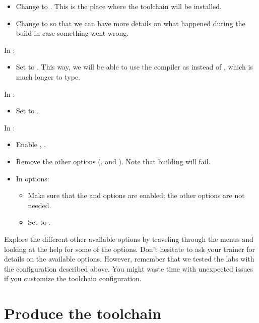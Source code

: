 \begin{itemize}
\item Change  to
  . This is the place where
  the toolchain will be installed.
\item Change  to  so that we can have more
  details on what happened during the build in case something went wrong.
\end{itemize}

In :
\begin{itemize}
\item Set  to . This way, we will
  be able to use the compiler as  instead of
  , which is much longer to
  type.
\end{itemize}

In :
\begin{itemize}
\item Set  to .
\end{itemize}

In :
\begin{itemize}
\item Enable , .
\item Remove the other options (,  and ).
 Note that building  will fail.
\item In  options:
  \begin{itemize}
  \item Make sure that the  and 
	options are enabled; the other options are not needed.
  \item Set  to .
  \end{itemize}
\end{itemize}

Explore the different other available options by traveling through the
menus and looking at the help for some of the options. Don't hesitate
to ask your trainer for details on the available options. However,
remember that we tested the labs with the configuration described
above. You might waste time with unexpected issues if you customize the
toolchain configuration.

\section{Produce the toolchain}

